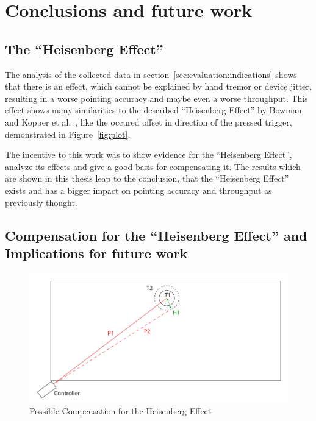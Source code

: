 
\chapter{Conclusions and future work}
\label{ch:conclusion}

\section{The ``Heisenberg Effect''}
\label{sec:conclusion:heisenberg}

The analysis of the collected data in section~\ref{sec:evaluation:indications} shows that there is an effect, which cannot be explained by hand tremor or device jitter, resulting in a worse pointing accuracy and maybe even a worse throughput. This effect shows many similarities to the described ``Heisenberg Effect'' by Bowman~\cite{bowman_using_2001} and Kopper et al.~\cite{kopper_human_2010}, like the occured offset in direction of the pressed trigger, demonstrated in Figure~\ref{fig:plot}. 

The incentive to this work was to show evidence for the ``Heisenberg Effect'', analyze its effects and give a good basis for compensating it. The results which are shown in this thesis leap to the conclusion, that the ``Heisenberg Effect'' exists and has a bigger impact on pointing accuracy and throughput as previously thought.

\section{Compensation for the ``Heisenberg Effect'' and Implications for future work}
\label{sec:conclusion:compensation_future_work}

\begin{figure}[h]
    \centering
    \includegraphics[width=.7\columnwidth]{graphics/heisenberg_effect_compensated.pdf}
    \caption{Possible Compensation for the Heisenberg Effect}
    \label{fig:heisenberg_effect_compensated}
\end{figure}

